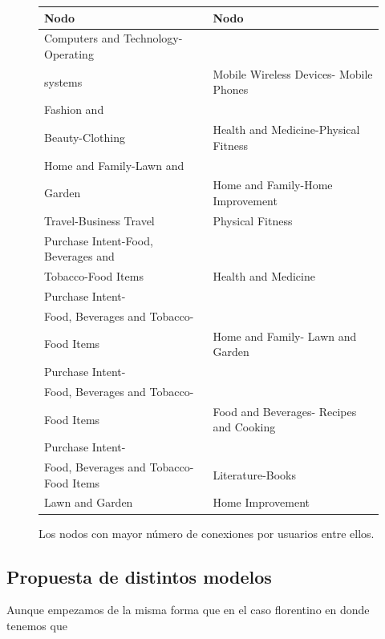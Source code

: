 \begin{figure}
 \begin{adjustwidth}{-3.6cm}{}
 \begin{tabular}{||C{2em} C{1em}||}
 \hline
 Nodo & Nodo \\ 
 \hline\hline
Computers and Technology-Operating \\
systems	&	Mobile  Wireless Devices-
Mobile Phones	\\
 \hline
 Fashion and \\
Beauty-Clothing	&	Health and Medicine-Physical Fitness	\\
 \hline
Home and Family-Lawn and \\
Garden	& Home and Family-Home Improvement	\\
\hline
Travel-Business Travel	& Physical Fitness	\\
\hline
Purchase Intent-Food, Beverages and \\
Tobacco-Food Items	&	Health and Medicine	\\
\hline
Purchase Intent-\\
Food, Beverages and Tobacco-\\
Food Items	&	Home and Family-
Lawn and Garden	\\
\hline
Purchase Intent-\\
Food, Beverages and Tobacco-\\
Food Items	&	Food and Beverages-
Recipes and Cooking	\\
\hline
Purchase Intent-\\
Food, Beverages and Tobacco-
Food Items	& Literature-Books	\\
\hline
Lawn and Garden	&	Home Improvement\\ [4ex] 

 \hline
\end{tabular}


 \end{adjustwidth}
 \caption{Los nodos con mayor número de conexiones por usuarios entre ellos.}
\end{figure}











\subsection{Propuesta de distintos modelos}

Aunque empezamos de la misma forma que en el caso florentino en donde tenemos que

